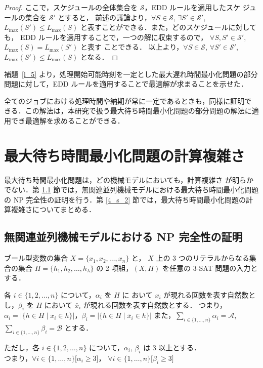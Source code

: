 \documentclass[12pt]{optlab-bachelor}
\begin{document}
\begin{proof}
  ここで，スケジュールの全体集合を $\mathcal{S}$，EDD ルールを適用したスケ
  ジュールの集合を $\mathcal{S}'$ とすると，
  前述の議論より，$\forall S \in \mathcal{S}$, $\exists S' \in \mathcal{S}'$, $L_{\max}(S') \le L_{\max}(S)$ と表すことができる．また，どのスケジュールに対しても，
  EDD ルールを適用することで，一つの解に収束するので，
  $\forall S, S' \in \mathcal{S}'$, $L_{\max}(S) = L_{\max}(S')$ と表す
  ことできる．
  以上より，$\forall S \in \mathcal{S}$, $\forall
  S' \in \mathcal{S}'$, $L_{\max}(S') \le L_{\max}(S)$ となる．
\end{proof}

補題~\ref{l_5} より，処理開始可能時刻を一定とした最大遅れ時間最小化問題の部分問題に対して，EDD ルールを適用することで最適解が求まることを示せた．

全てのジョブにおける処理時間や納期が常に一定であるときも，同様に証明で
きる．この解法は，本研究で扱う最大待ち時間最小化問題の部分問題の解法に適用でき最適解を求めることができる．

\chapter{最大待ち時間最小化問題の計算複雑さ}\label{c_4}
最大待ち時間最小化問題は，どの機械モデルにおいても，計算複雑さ
が明らかでない．第 \ref{4_s_1} 節では，無関連並列機械モデルにおける最大待ち時間最小化問題の NP 完全性の証明を行う．第 \ref{4_s_2} 節では，最大待ち時間最小化問題の計算複雑さについてまとめる．

\section{無関連並列機械モデルにおける NP 完全性の証明}\label{4_s_1}

ブール型変数の集合 $X =\{x_1, x_2,\ldots ,x_n\}$ と， $X$ 上の 3 つのリテラルからなる集合の集合 $H =\{h_1, h_2,\ldots ,h_{\lambda}\}$ の 2 項組，$(X,H)$ を任意の \textsc{3-SAT} 問題の入力とする．

各 $i \in \{1,2,\ldots, n\}$ について，$\alpha_i$ を $H$ に おいて $x_i$ が現れる回数を表す自然数とし，$\beta_i$ を $H$ において $\bar x_i$ が現れる回数を表す自然数とする．
つまり，$\alpha_i = \big|\{h \in H \mid x_i \in h\}\big|$，$\beta_i = \big|\{h \in H \mid \bar x_i \in h\}\big|$
また，$\displaystyle \sum_{i \in \{1,\ldots,n\}} \alpha_i = \mathcal{A}$, $\displaystyle \sum_{i \in \{1,\ldots,n\}} \beta_i = \mathcal{B}$  とする．

ただし，各 $i \in \{1,2,\ldots, n\}$ について，$\alpha_i$, $\beta_i$ は 3 以上とする．\\
つまり，$\forall i \in \{1,\ldots,n\}\big[\alpha_i \ge 3\big]$，
$\forall i \in \{1,\ldots,n\}\big[\beta_i \ge 3\big]$
\end{document}
